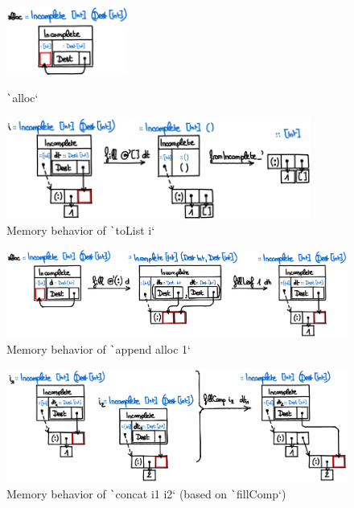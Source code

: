\documentclass[english]{jflart}
\begin{document}
\begin{figure}[p]\centering
  \hspace{-0.5cm}\begin{minipage}{0.3\textwidth}
    \includegraphics[width=4cm]{alloc.png}
    \caption{\texttt`alloc`}
    \label{fig:schema-alloc}
  \end{minipage}\hspace{0.5cm}%
  \begin{minipage}{0.7\textwidth}
    \includegraphics[width=10cm]{dlist-toList.png}
    \caption{Memory behavior of \texttt`toList i`}
    \label{fig:schema-dlist-toList}
  \end{minipage}
\end{figure}

\begin{figure}[p]\centering
  \includegraphics[width=13.8cm]{dlist-append.png}
  \caption{Memory behavior of \texttt`append alloc 1`}
  \label{fig:schema-dlist-append}
\end{figure}

\begin{figure}[p]\centering
  \includegraphics[width=13cm]{dlist-concat.png}
  \caption{Memory behavior of \texttt`concat i1 i2` (based on \texttt`fillComp`)}
  \label{fig:schema-dlist-concat}
\end{figure}
\end{document}
